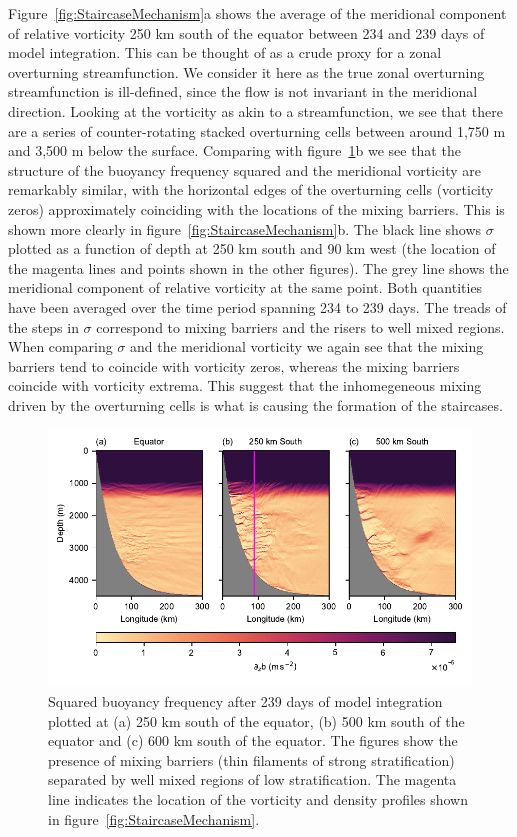Figure~\ref{fig:StaircaseMechanism}a shows the average of the meridional component of relative vorticity 250 km south of the equator between 234 and 239  days of model integration. This can be thought of as a crude proxy for a zonal overturning streamfunction. We consider it here as the true zonal overturning streamfunction is ill-defined, since the flow is not invariant in the meridional direction. Looking at the vorticity as akin to a streamfunction, we see that there are a series of counter-rotating stacked overturning cells between around 1,750 m and 3,500 m below the surface. Comparing with figure~\ref{fig:staircase}b we see that the structure of the buoyancy frequency squared and the meridional vorticity are remarkably similar, with the horizontal edges of the overturning cells (vorticity zeros) approximately coinciding with the locations of the mixing barriers. This is shown more clearly in figure~\ref{fig:StaircaseMechanism}b. The black line shows $\sigma$  plotted as a function of  depth at 250 km south and 90 km west (the location of the magenta lines and points shown in the other  figures). The grey line shows the meridional component of relative vorticity at the same point. Both quantities  have  been averaged over the time period spanning 234 to 239 days. The treads of the steps in $\sigma$ correspond to mixing barriers and the risers to well mixed regions. When comparing $\sigma$ and the meridional vorticity we again see that the mixing barriers tend to coincide with vorticity zeros, whereas the mixing barriers coincide with vorticity extrema. This suggest that the inhomegeneous mixing driven by the overturning cells is what is causing the formation of the staircases.

\begin{figure}[h]
    \centering
    \includegraphics{../figures/Figure2.pdf}
    \caption{Squared buoyancy frequency after 239 days of model integration plotted at (a) 250 km south of the equator,  (b) 500 km south of the equator and (c) 600 km south of the equator. The figures show the presence of mixing barriers (thin filaments of strong stratification) separated by well mixed regions of low stratification. The magenta line indicates the location of the vorticity and density profiles shown in figure~\ref{fig:StaircaseMechanism}.}
    \label{fig:staircase}
\end{figure}

